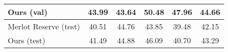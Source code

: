\begin{table}[t]
\begin{tabular}{lccccc}
		Ours (val)			& 43.99 & 43.64 & 50.48 & 47.96 & 44.66 \\
		\midrule
		Merlot Reserve (test) & 40.51 & 44.76 & 43.85 & 39.48 & 42.15 \\
		Ours (test)			& 41.49 & 44.88 & 46.09 & 40.70 & 43.29 \\
        \bottomrule
	\end{tabular}
\end{table}


